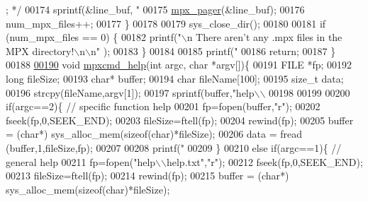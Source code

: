 \begin{DoxyCode}
{{{{{{      ; */}
00174                 sprintf(&line\_buf, \textcolor{stringliteral}{"    %
00175                 \hyperlink{mpx__util_8c_a9e59881f10bd91d7255f18f205e101e6}{mpx_pager}(&line\_buf);
00176                 num\_mpx\_files++;
00177         \}
00178 
00179         sys\_close\_dir();
00180 
00181         \textcolor{keywordflow}{if} (num\_mpx\_files == 0) \{
00182                 printf(\textcolor{stringliteral}{"\(\backslash\)n There aren't any .mpx files in the MPX directory!\(\backslash\)n\(\backslash\)n"
      });
00183         \}
00184 
00185         printf(\textcolor{stringliteral}{"%
00186         \textcolor{keywordflow}{return};
00187 \}
00188 
\hypertarget{_m_p_x___c_m_d_8_c_source_l00190}{}\hyperlink{mpx__cmd_8h_ae9b1349cfcfc34815e87cae5330660e8}{00190} \textcolor{keywordtype}{void} \hyperlink{_m_p_x___c_m_d_8_c_ae9b1349cfcfc34815e87cae5330660e8}{mpxcmd_help}(\textcolor{keywordtype}{int} argc, \textcolor{keywordtype}{char} *argv[])\{
00191         FILE *fp;
00192         \textcolor{keywordtype}{long} fileSize;
00193         \textcolor{keywordtype}{char}* buffer;
00194         \textcolor{keywordtype}{char} fileName[100];
00195         \textcolor{keywordtype}{size\_t} data;    
00196         strcpy(fileName,argv[1]);
00197         sprintf(buffer,\textcolor{stringliteral}{"help\(\backslash\)\(\backslash\)%
00198 
00199         
00200         \textcolor{keywordflow}{if}(argc==2)\{ \textcolor{comment}{// specific function help}
00201                 fp=fopen(buffer,\textcolor{stringliteral}{"r"}); 
00202                 fseek(fp,0,SEEK\_END); 
00203                 fileSize=ftell(fp); 
00204                 rewind(fp); 
00205                 buffer = (\textcolor{keywordtype}{char}*) sys\_alloc\_mem(\textcolor{keyword}{sizeof}(\textcolor{keywordtype}{char})*fileSize);
00206                 data = fread (buffer,1,fileSize,fp); 
00207                 
00208                 printf(\textcolor{stringliteral}{"%
00209         \}
00210         \textcolor{keywordflow}{else} \textcolor{keywordflow}{if}(argc==1)\{ \textcolor{comment}{// general help}
00211                 fp=fopen(\textcolor{stringliteral}{"help\(\backslash\)\(\backslash\)help.txt"},\textcolor{stringliteral}{"r"}); 
00212                 fseek(fp,0,SEEK\_END);
00213                 fileSize=ftell(fp);
00214                 rewind(fp);
00215                 buffer = (\textcolor{keywordtype}{char}*) sys\_alloc\_mem(\textcolor{keyword}{sizeof}(\textcolor{keywordtype}{char})*fileSize);
}}}}}}}}}
\end{DoxyCode}
